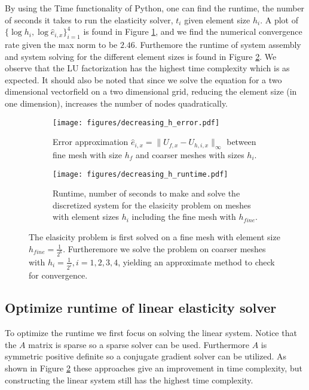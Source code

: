 \documentclass[a4paper,english]{elsarticle}%
\begin{document}
By using the Time functionality of Python, one can find the runtime, the number of seconds it takes to run the elasticity solver, $t_i$ given element size $h_i$. A plot of $\{\log h_i,\log \hat e_{i,x}\}_{i=1}^4$ is found in Figure \ref{error-convergence-elastic}, and we find the numerical convergence rate given the max norm to be $2.46$. Furthemore the runtime of system assembly and system solving for the different element sizes is found in Figure \ref{time-convergence-elastic}. We observe that the LU factorization has the highest time complexity which is as expected. It should also be noted that since we solve the equation for a two dimensional vectorfield on a two dimensional grid, reducing the element size (in one dimension), increases the number of nodes quadratically.

\begin{figure}[t]
    \begin{subfigure}[t]{0.5\linewidth}
            \centering
                \texttt{[image: figures/decreasing\_h\_error.pdf]}
            \caption{Error approximation $\hat e_{i,x} = \|U_{f,x} - U_{h,i,x}\|_{\infty}$ between fine mesh with size $h_f$ and coarser meshes with sizes $h_i$.}
            \label{error-convergence-elastic}
        \end{subfigure}\qquad
        \begin{subfigure}[t]{0.5\linewidth}
            \centering
                \texttt{[image: figures/decreasing\_h\_runtime.pdf]}
            \caption{Runtime, number of seconds to make and solve the discretized system for the elasicity problem on meshes with element sizes $h_i$ including the fine mesh with $h_{fine}.$ }
            \label{time-convergence-elastic}
        \end{subfigure}
        \label{fig-convergence-elastic}
        \caption{The elasicity problem is first solved on a fine mesh with element size $h_{fine} = \frac{1}{2^6}$. Furtheremore we solve the problem on coarser meshes with $h_i = \frac{1}{2^i}, i = 1,2,3,4$, yielding an approximate method to check for convergence.}
    \end{figure}


\subsection{Optimize runtime of linear elasticity solver }
To optimize the runtime we first focus on solving the linear system. Notice that the $A$ matrix is sparse so a sparse solver can be used. Furthermore $A$ is symmetric positive definite so a conjugate gradient solver can be utilized. As shown in Figure \ref{time-convergence-elastic} these approaches give an improvement in time complexity, but constructing the linear system still has the highest time complexity. 
 
\end{document}
